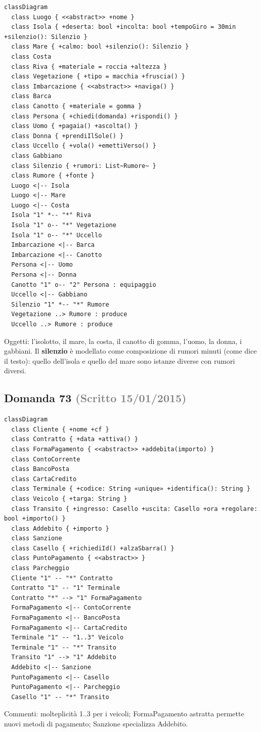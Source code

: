 \documentclass[a4paper,11pt]{article}
\begin{document}
\begin{verbatim}
classDiagram
  class Luogo { <<abstract>> +nome }
  class Isola { +deserta: bool +incolta: bool +tempoGiro = 30min +silenzio(): Silenzio }
  class Mare { +calmo: bool +silenzio(): Silenzio }
  class Costa
  class Riva { +materiale = roccia +altezza }
  class Vegetazione { +tipo = macchia +fruscia() }
  class Imbarcazione { <<abstract>> +naviga() }
  class Barca
  class Canotto { +materiale = gomma }
  class Persona { +chiedi(domanda) +rispondi() }
  class Uomo { +pagaia() +ascolta() }
  class Donna { +prendiIlSole() }
  class Uccello { +vola() +emettiVerso() }
  class Gabbiano
  class Silenzio { +rumori: List~Rumore~ }
  class Rumore { +fonte }
  Luogo <|-- Isola
  Luogo <|-- Mare
  Luogo <|-- Costa
  Isola "1" *-- "*" Riva
  Isola "1" o-- "*" Vegetazione
  Isola "1" o-- "*" Uccello
  Imbarcazione <|-- Barca
  Imbarcazione <|-- Canotto
  Persona <|-- Uomo
  Persona <|-- Donna
  Canotto "1" o-- "2" Persona : equipaggio
  Uccello <|-- Gabbiano
  Silenzio "1" *-- "*" Rumore
  Vegetazione ..> Rumore : produce
  Uccello ..> Rumore : produce
\end{verbatim}
Oggetti: l'isolotto, il mare, la costa, il canotto di gomma, l'uomo, la donna, i gabbiani. Il \textbf{silenzio} è modellato come composizione di rumori minuti (come dice il testo): quello dell'isola e quello del mare sono istanze diverse con rumori diversi.



\subsection*{Domanda 73 \hfill {\small \textcolor{gray}{(Scritto 15/01/2015)}}}


\begin{verbatim}
classDiagram
  class Cliente { +nome +cf }
  class Contratto { +data +attiva() }
  class FormaPagamento { <<abstract>> +addebita(importo) }
  class ContoCorrente
  class BancoPosta
  class CartaCredito
  class Terminale { +codice: String «unique» +identifica(): String }
  class Veicolo { +targa: String }
  class Transito { +ingresso: Casello +uscita: Casello +ora +regolare: bool +importo() }
  class Addebito { +importo }
  class Sanzione
  class Casello { +richiediId() +alzaSbarra() }
  class PuntoPagamento { <<abstract>> }
  class Parcheggio
  Cliente "1" -- "*" Contratto
  Contratto "1" -- "1" Terminale
  Contratto "*" --> "1" FormaPagamento
  FormaPagamento <|-- ContoCorrente
  FormaPagamento <|-- BancoPosta
  FormaPagamento <|-- CartaCredito
  Terminale "1" -- "1..3" Veicolo
  Terminale "1" -- "*" Transito
  Transito "1" --> "1" Addebito
  Addebito <|-- Sanzione
  PuntoPagamento <|-- Casello
  PuntoPagamento <|-- Parcheggio
  Casello "1" -- "*" Transito
\end{verbatim}
Commenti: molteplicità 1..3 per i veicoli; FormaPagamento astratta permette nuovi metodi di pagamento; Sanzione specializza Addebito.
\end{document}
